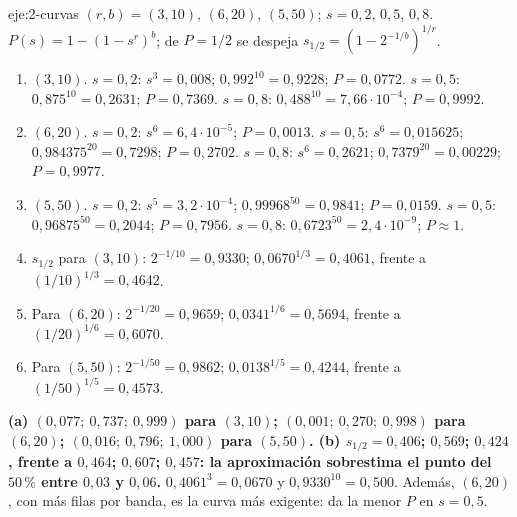 \begin{solucion}{eje:2-curvas}
\datos $(r,b)=(3,10)$, $(6,20)$, $(5,50)$; $s=0{,}2$, $0{,}5$, $0{,}8$.
\planteamiento $P(s)=1-(1-s^{r})^{b}$; de $P=1/2$ se despeja $s_{1/2}=(1-2^{-1/b})^{1/r}$.
\pasos
\begin{enumerate}[label=\arabic*.]
  \item $(3,10)$. $s=0{,}2$: $s^{3}=0{,}008$; $0{,}992^{10}=0{,}9228$; $P=0{,}0772$. $s=0{,}5$: $0{,}875^{10}=0{,}2631$; $P=0{,}7369$. $s=0{,}8$: $0{,}488^{10}=7{,}66\cdot 10^{-4}$; $P=0{,}9992$.
  \item $(6,20)$. $s=0{,}2$: $s^{6}=6{,}4\cdot 10^{-5}$; $P=0{,}0013$. $s=0{,}5$: $s^{6}=0{,}015625$; $0{,}984375^{20}=0{,}7298$; $P=0{,}2702$. $s=0{,}8$: $s^{6}=0{,}2621$; $0{,}7379^{20}=0{,}00229$; $P=0{,}9977$.
  \item $(5,50)$. $s=0{,}2$: $s^{5}=3{,}2\cdot 10^{-4}$; $0{,}99968^{50}=0{,}9841$; $P=0{,}0159$. $s=0{,}5$: $0{,}96875^{50}=0{,}2044$; $P=0{,}7956$. $s=0{,}8$: $0{,}6723^{50}=2{,}4\cdot 10^{-9}$; $P\approx 1$.
  \item $s_{1/2}$ para $(3,10)$: $2^{-1/10}=0{,}9330$; $0{,}0670^{1/3}=0{,}4061$, frente a $(1/10)^{1/3}=0{,}4642$.
  \item Para $(6,20)$: $2^{-1/20}=0{,}9659$; $0{,}0341^{1/6}=0{,}5694$, frente a $(1/20)^{1/6}=0{,}6070$.
  \item Para $(5,50)$: $2^{-1/50}=0{,}9862$; $0{,}0138^{1/5}=0{,}4244$, frente a $(1/50)^{1/5}=0{,}4573$.
\end{enumerate}
\resultado \textbf{(a) $(0{,}077;\ 0{,}737;\ 0{,}999)$ para $(3,10)$; $(0{,}001;\ 0{,}270;\ 0{,}998)$ para $(6,20)$; $(0{,}016;\ 0{,}796;\ 1{,}000)$ para $(5,50)$. (b) $s_{1/2}=0{,}406$; $0{,}569$; $0{,}424$, frente a $0{,}464$; $0{,}607$; $0{,}457$: la aproximación sobrestima el punto del $50\,\%$ entre $0{,}03$ y $0{,}06$.}
\comprobacion $0{,}4061^{3}=0{,}0670$ y $0{,}9330^{10}=0{,}500$. Además, $(6,20)$, con más filas por banda, es la curva más exigente: da la menor $P$ en $s=0{,}5$.
\end{solucion}

